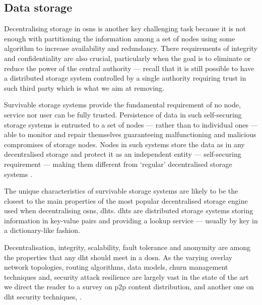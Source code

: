 \subsection{Data storage}
    \label{subsection:thesis:data-storage}
Decentralising storage in \acp{osn} is another key challenging 
task because it is not enough with partitioning the information among a set of nodes 
using some algorithm to increase availability and redundancy. There requirements 
of integrity and confidentiality are also crucial, particularly when the goal is 
to eliminate or reduce the power of the central authority --- recall that it is 
still possible to have a distributed storage system controlled by a single authority 
requiring trust in such third party which is what we aim at removing.

Survivable storage systems provide the fundamental requirement of no node, service 
nor user can be fully trusted. Persistence of data in such self-securing storage 
systems is entrusted to a set of nodes --- rather than to individual ones --- able 
to monitor and repair themselves guaranteeing malfunctioning and malicious compromises 
of storage nodes. Nodes in such systems store the data as in any decentralised storage 
and protect it as an independent entity --- self-securing requirement --- making 
them different from `regular' decentralised storage systems \cite{WylieBSGKK00}.
 
The unique characteristics of survivable storage systems are likely to be the closest 
to the main properties of the most popular decentralised storage engine used when 
decentralising \acp{osn}, \acp{dht}. \acp{dht} are distributed storage systems storing 
information in key-value pairs and providing a lookup service --- usually by key 
in a dictionary-like fashion.

Decentralisation, integrity, scalability, fault tolerance and anonymity are among 
the properties that any \ac{dht} should meet in a \ac{dosn}. As the varying overlay 
network topologies, routing algorithms, data models, churn management techniques and, 
security attack resilience are largely vast in the state of the art we direct the 
reader to a survey on \ac{p2p} content distribution, \cite{Androutsellis-TheotokisSLS10} 
and another one on \ac{dht} security techniques, \cite{UrdanetaPS11}.



